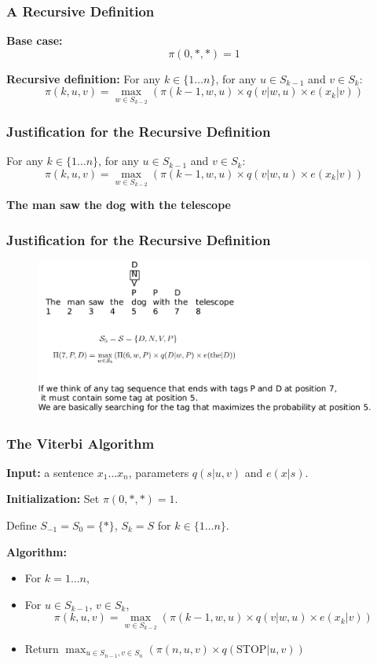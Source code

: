 \documentclass[handout]{beamer}
\begin{document}
\begin{frame}
  \frametitle{A Recursive Definition}
  \textbf{Base case:}
  \[
    \pi(0, *, *) = 1
  \]

  \textbf{Recursive definition:}
  For any $k \in \{1 \ldots n\}$, for any $u \in S_{k-1}$ and $v \in S_k$:
  \[
    \pi(k, u, v) = \max_{w \in S_{k-2}} (\pi(k - 1, w, u) \times q(v|w, u) \times e(x_k|v))
  \]
\end{frame}

\begin{frame}
  \frametitle{Justification for the Recursive Definition}
  For any $k \in \{1 \ldots n\}$, for any $u \in S_{k-1}$ and $v \in S_k$:
  \[
    \pi(k, u, v) = \max_{w \in S_{k-2}} (\pi(k - 1, w, u) \times q(v|w, u) \times e(x_k|v))
  \]

  \textbf{The man saw the dog with the telescope}
\end{frame}


\begin{frame}
  \frametitle{Justification for the Recursive Definition}

  \begin{figure}[h]
        	\includegraphics[scale = 0.65]{pics/viterbi2.pdf}
        \end{figure}
\end{frame}

\begin{frame}
  \frametitle{The Viterbi Algorithm}
  \textbf{Input:} a sentence $x_1 \ldots x_n$, parameters $q(s|u, v)$ and $e(x|s)$.

  \textbf{Initialization:} Set $\pi(0, *, *) = 1$.

  Define $S_{-1} = S_0 = \{*\}$, $S_k = S$ for $k \in \{1 \ldots n\}$.

  \textbf{Algorithm:}
  \begin{itemize}
    \item For $k = 1 \ldots n$,
    \item For $u \in S_{k-1}$, $v \in S_k$,
    \[
      \pi(k, u, v) = \max_{w \in S_{k-2}} (\pi(k - 1, w, u) \times q(v|w, u) \times e(x_k|v))
    \]
    \item Return $\max_{u \in S_{n-1}, v \in S_n} (\pi(n, u, v) \times q(\text{STOP}|u, v))$
  \end{itemize}
\end{frame}
\end{document}
